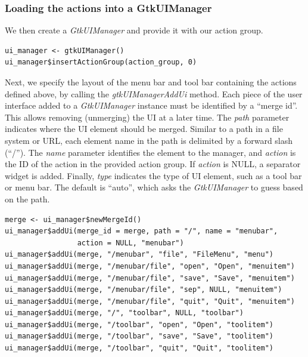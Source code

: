 \documentclass[article]{jss}
\begin{document}
\subsubsection{Loading the actions into a GtkUIManager}

We then create a \emph{GtkUIManager} and provide it with our action group.
\begin{verbatim}
ui_manager <- gtkUIManager()
ui_manager$insertActionGroup(action_group, 0)
\end{verbatim}
Next, we specify
the layout of the menu bar and tool bar containing the actions defined
above, by calling the \emph{gtkUIManagerAddUi} method. Each piece of
the user interface added to a \emph{GtkUIManager} instance must be identified by a
``merge id''. This allows removing (unmerging) the UI at a later time.
The \emph{path} parameter indicates where the UI element should be
merged. Similar to a path in a file system or URL, each element name in the path is
delimited by a forward slash (``/''). The \emph{name} parameter
identifies the element to the manager, and \emph{action} is the ID of
the action in the provided action group. If \emph{action} is NULL, a
separator widget is added. Finally, \emph{type} indicates the type of
UI element, such as a tool bar or menu bar. The default is ``auto'',
which asks the \emph{GtkUIManager} to guess based on the path.
\begin{verbatim}
merge <- ui_manager$newMergeId()
ui_manager$addUi(merge_id = merge, path = "/", name = "menubar",
                 action = NULL, "menubar")
ui_manager$addUi(merge, "/menubar", "file", "FileMenu", "menu")
ui_manager$addUi(merge, "/menubar/file", "open", "Open", "menuitem")
ui_manager$addUi(merge, "/menubar/file", "save", "Save", "menuitem")
ui_manager$addUi(merge, "/menubar/file", "sep", NULL, "menuitem")
ui_manager$addUi(merge, "/menubar/file", "quit", "Quit", "menuitem")
ui_manager$addUi(merge, "/", "toolbar", NULL, "toolbar")
ui_manager$addUi(merge, "/toolbar", "open", "Open", "toolitem")
ui_manager$addUi(merge, "/toolbar", "save", "Save", "toolitem")
ui_manager$addUi(merge, "/toolbar", "quit", "Quit", "toolitem")
\end{verbatim}
\end{document}
